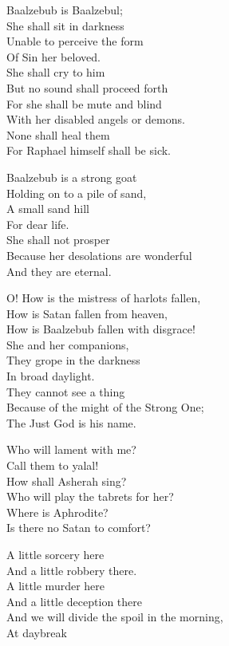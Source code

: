 \documentclass[
]{book}
\begin{document}
Baalzebub is Baalzebul;\\
She shall sit in darkness\\
Unable to perceive the form\\
Of Sin her beloved.\\
She shall cry to him\\
But no sound shall proceed forth\\
For she shall be mute and blind\\
With her disabled angels or demons.\\
None shall heal them\\
For Raphael himself shall be sick.

Baalzebub is a strong goat\\
Holding on to a pile of sand,\\
A small sand hill\\
For dear life.\\
She shall not prosper\\
Because her desolations are wonderful\\
And they are eternal.

O! How is the mistress of harlots fallen,\\
How is Satan fallen from heaven,\\
How is Baalzebub fallen with disgrace!\\
She and her companions,\\
They grope in the darkness\\
In broad daylight.\\
They cannot see a thing\\
Because of the might of the Strong One;\\
The Just God is his name.

Who will lament with me?\\
Call them to yalal!\\
How shall Asherah sing?\\
Who will play the tabrets for her?\\
Where is Aphrodite?\\
Is there no Satan to comfort?

A little sorcery here\\
And a little robbery there.\\
A little murder here\\
And a little deception there\\
And we will divide the spoil in the morning,\\
At daybreak
\end{document}
